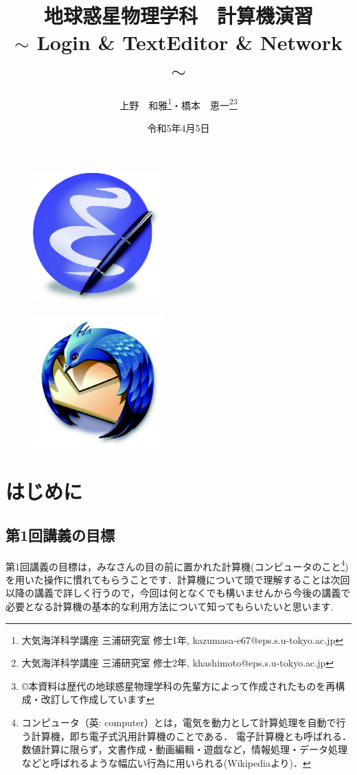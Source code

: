 \documentclass{jarticle}
\title{\bf{地球惑星物理学科　計算機演習}\\
$\sim$ Login \& TextEditor \& Network $\sim$}
\author{上野　和雅\footnote{大気海洋科学講座 三浦研究室 修士1年, kazumasa-e67@eps.s.u-tokyo.ac.jp}・橋本　恵一\footnote{大気海洋科学講座 三浦研究室 修士2年, khashimoto@eps.s.u-tokyo.ac.jp}\footnote{\copyright 本資料は歴代の地球惑星物理学科の先輩方によって作成されたものを再構成・改訂して作成しています}}
\date{令和5年4月5日}
\begin{document}
\maketitle

\begin{figure}[h]
 \begin{minipage}{0.5\hsize}
  \begin{center}
   \includegraphics[width=50mm,pagebox=cropbox,clip]{fig/emacs.pdf}
  \end{center}
  \label{fig:one}
 \end{minipage}
 \begin{minipage}{0.5\hsize}
  \begin{center}
   \includegraphics[width=50mm,pagebox=cropbox,clip]{fig/mozilla-thunderbird.pdf}
  \end{center}
  \label{fig:two}
 \end{minipage}
\end{figure}

\tableofcontents

\addtocounter{section}{-1}

\section{はじめに}
\subsection{第1回講義の目標}
第1回講義の目標は，みなさんの目の前に置かれた計算機(コンピュータのこと\footnote{コンピュータ（英: computer）とは，電気を動力として計算処理を自動で行う計算機，即ち電子式汎用計算機のことである． 電子計算機とも呼ばれる． 数値計算に限らず，文書作成・動画編輯・遊戯など，情報処理・データ処理などと呼ばれるような幅広い行為に用いられる(Wikipediaより)．})を用いた操作に慣れてもらうことです．計算機について頭で理解することは次回以降の講義で詳しく行うので，今回は何となくでも構いませんから今後の講義で必要となる計算機の基本的な利用方法について知ってもらいたいと思います.
\end{document}
